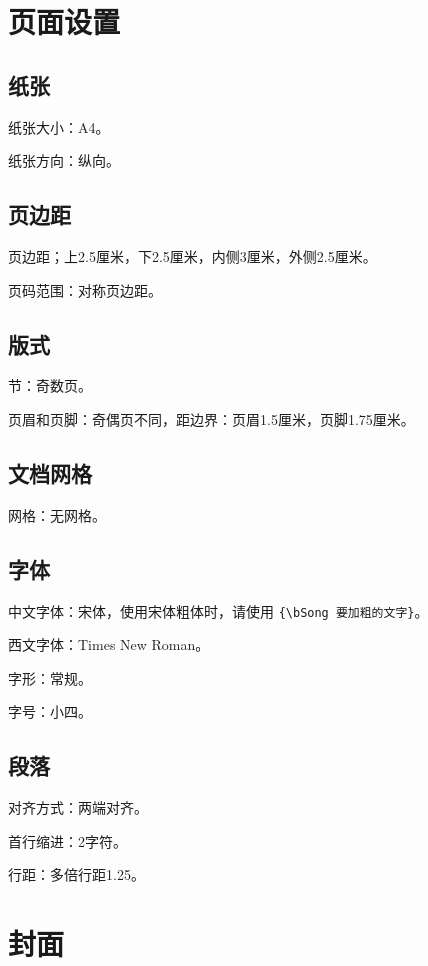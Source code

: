 \section{页面设置}
\subsection{纸张}
\par 纸张大小：A4。
\par 纸张方向：纵向。

\subsection{页边距}
\par 页边距；上2.5厘米，下2.5厘米，内侧3厘米，外侧2.5厘米。
\par 页码范围：对称页边距。

\subsection{版式}
\par 节：奇数页。
\par 页眉和页脚：奇偶页不同，距边界：页眉1.5厘米，页脚1.75厘米。

\subsection{文档网格}
\par 网格：无网格。

\subsection{字体}
\par 中文字体：宋体，使用{\bSong 宋体粗体}时，请使用 \verb|{\bSong 要加粗的文字}|。
\par 西文字体：Times New Roman。
\par 字形：常规。
\par 字号：小四。

\subsection{段落}
\par 对齐方式：两端对齐。
\par 首行缩进：2字符。
\par 行距：多倍行距1.25。

\section{封面}
